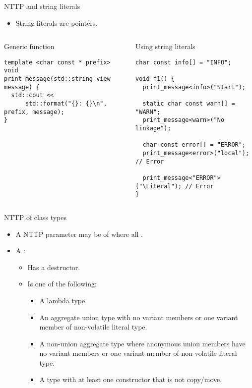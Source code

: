 \begin{frame}[t,fragile]{NTTP and string literals}
\begin{itemize}
  \item String literals are pointers.
\end{itemize}

\begin{columns}[T]

\begin{block}{Generic function}
\begin{lstlisting}
template <char const * prefix>
void print_message(std::string_view message) {
  std::cout << 
      std::format("{}: {}\n", prefix, message);
}

\end{lstlisting}
\end{block}

\pause
{}
\begin{block}{Using string literals}
\begin{lstlisting}
char const info[] = "INFO"; 

void f1() {
  print_message<info>("Start");

  static char const warn[] = "WARN";
  print_message<warn>("No linkage");

  char const error[] = "ERROR";
  print_message<error>("local"); // Error

  print_message<"ERROR">("\Literal"); // Error
}
\end{lstlisting}
\end{block}

\end{columns}
\end{frame}

\begin{frame}[t,fragile]{NTTP of class types}
\begin{itemize}
  \item A NTTP parameter may be of  where all .
  
  \item A :
    \begin{itemize}
      \item Has a  destructor.
      \item Is one of the following:
        \begin{itemize}
          \item A lambda type.
          \item An aggregate union type with 
                no variant members or one variant member of non-volatile literal type.
          \item A non-union aggregate type where anonymous union members have
                no variant members or one variant member of non-volatile literal type.
          \item A type with at least one  constructor that is not copy/move.
        \end{itemize}
    \end{itemize}
\end{itemize}
\end{frame}

